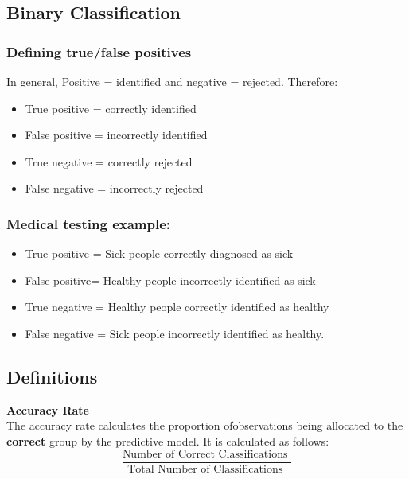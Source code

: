 \documentclass[caret-main.tex]{subfiles}
\begin{document}
\subsection{Binary Classification}
\subsubsection*{Defining true/false positives}
In general, Positive = identified and negative = rejected. Therefore:

\begin{itemize}
\item True positive = correctly identified

\item False positive = incorrectly identified

\item True negative = correctly rejected

\item False negative = incorrectly rejected
\end{itemize}
\subsubsection*{Medical testing example:}
\begin{itemize}
\item True positive = Sick people correctly diagnosed as sick

\item False positive= Healthy people incorrectly identified as sick

\item True negative = Healthy people correctly identified as healthy

\item False negative = Sick people incorrectly identified as healthy.
\end{itemize}

\subsection{Definitions}
\textbf{Accuracy Rate}\\
The accuracy rate calculates the proportion ofobservations being allocated to the \textbf{correct} group by the predictive model. It is calculated as follows:
\[ \frac{
\mbox{Number of Correct Classifications }}{\mbox{Total Number of Classifications }} \]
\end{document}
